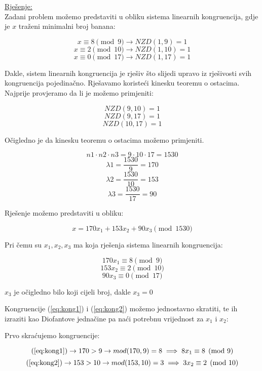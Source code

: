 \documentclass[12pt]{article}
\begin{document}
\underline{Rješenje:}\\

\hspace{0.65cm}Zadani problem možemo predstaviti u obliku sistema linearnih kongruencija, gdje je $x$ traženi minimalni broj banana:

$$x \equiv 8 \pmod{9} \to NZD(1, 9) = 1$$
$$x \equiv 2 \pmod{10} \to NZD(1, 10) = 1$$
$$x \equiv 0 \pmod{17} \to NZD(1, 17) = 1$$\vspace{1mm}

Dakle, sistem linearnih kongruencija je rješiv što slijedi upravo iz rješivosti svih kongruencija pojedinačno. Rješavamo koristeći kinesku teoremu o ostacima. Najprije provjeramo da li je možemo primjeniti: 

$$NZD(9, 10) = 1$$
$$NZD(9, 17) = 1$$
$$NZD(10, 17) = 1$$\vspace{1mm}

Očigledno je da kinesku teoremu o ostacima možemo primjeniti.

$$n1 \cdot n2 \cdot n3 = 9 \cdot 10 \cdot 17 = 1530$$\vspace{1mm}
$$\lambda 1 = \frac{1530}{9} = 170$$\vspace{1mm}
$$\lambda 2 = \frac{1530}{10} = 153$$\vspace{1mm}
$$\lambda 3 = \frac{1530}{17} = 90$$\vspace{1mm}

Rješenje možemo predstaviti u obliku:

$$x = 170x_{1} + 153x_{2} + 90x_{3} \pmod{1530}$$\vspace{1mm}

Pri čemu su $x_{1}, x_{2}, x_{3}$ ma koja rješenja sistema linearnih kongruencija:

\[
170x_{1} \equiv 8 \pmod{9} \label{eq:kong1} \tag{A}
\]
\[
153x_{2} \equiv 2 \pmod{10} \label{eq:kong2} \tag{B}
\]
$$90x_{3} \equiv 0 \pmod{17}$$

\begin{center}
$x_{3}$ je očigledno bilo koji cijeli broj, dakle $x_{3} = 0$
\end{center}\vspace{1mm}

Kongruencije (\ref{eq:kong1}) i (\ref{eq:kong2}) možemo jednostavno skratiti, te ih izraziti kao Diofantove jednačine pa naći potrebnu vrijednost za $x_{1}$ i $x_{2}$:

Prvo skraćujemo kongruencije:

$$(\ref{eq:kong1}) \to 170 > 9 \to mod(170, 9) = 8 \implies 8x_{1} \equiv 8 \pmod{9}$$
$$(\ref{eq:kong2}) \to 153 > 10 \to mod(153, 10) = 3 \implies 3x_{2} \equiv 2 \pmod{10}$$\vspace{1mm}
\end{document}
